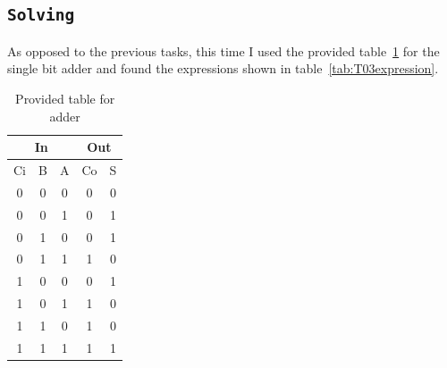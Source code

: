 \documentclass{article}
\let\oldsubsection\subsection
\renewcommand{\subsection}[1]{%
  \oldsubsection{\texttt{#1}}%
  \setcounter{subsubsection}{-1}%
}
\begin{document}
\subsection{Solving}
As opposed to the previous tasks, this time I used the provided table~\ref{tab:T03addertruthtable} for the single bit adder and found the expressions shown in table~\ref{tab:T03expression}.

\begin{table}[htbp]
  \centering
  \caption{Provided table for adder}
    \begin{tabular}{|c|c|c|c|c|}
    \hline
    \multicolumn{3}{|c|}{In} & \multicolumn{2}{c|}{Out} \bigstrut\\
    \hline
    Ci    & B     & A     & Co    & S \bigstrut\\
    \hline
    \rowcolor[rgb]{ .851,  .851,  .851} 0     & 0     & 0     & \cellcolor[rgb]{ .71,  .902,  .635}0 & \cellcolor[rgb]{ .71,  .902,  .635}0 \bigstrut\\
    \hline
    \rowcolor[rgb]{ .851,  .851,  .851} 0     & 0     & 1     & \cellcolor[rgb]{ .71,  .902,  .635}0 & \cellcolor[rgb]{ .71,  .902,  .635}1 \bigstrut\\
    \hline
    \rowcolor[rgb]{ .851,  .851,  .851} 0     & 1     & 0     & \cellcolor[rgb]{ .71,  .902,  .635}0 & \cellcolor[rgb]{ .71,  .902,  .635}1 \bigstrut\\
    \hline
    \rowcolor[rgb]{ .851,  .851,  .851} 0     & 1     & 1     & \cellcolor[rgb]{ .71,  .902,  .635}1 & \cellcolor[rgb]{ .71,  .902,  .635}0 \bigstrut\\
    \hline
    \rowcolor[rgb]{ .851,  .851,  .851} 1     & 0     & 0     & \cellcolor[rgb]{ .71,  .902,  .635}0 & \cellcolor[rgb]{ .71,  .902,  .635}1 \bigstrut\\
    \hline
    \rowcolor[rgb]{ .851,  .851,  .851} 1     & 0     & 1     & \cellcolor[rgb]{ .71,  .902,  .635}1 & \cellcolor[rgb]{ .71,  .902,  .635}0 \bigstrut\\
    \hline
    \rowcolor[rgb]{ .851,  .851,  .851} 1     & 1     & 0     & \cellcolor[rgb]{ .71,  .902,  .635}1 & \cellcolor[rgb]{ .71,  .902,  .635}0 \bigstrut\\
    \hline
    \rowcolor[rgb]{ .851,  .851,  .851} 1     & 1     & 1     & \cellcolor[rgb]{ .71,  .902,  .635}1 & \cellcolor[rgb]{ .71,  .902,  .635}1 \bigstrut\\
    \hline
    \end{tabular}%
  \label{tab:T03addertruthtable}%
\end{table}%
\end{document}
